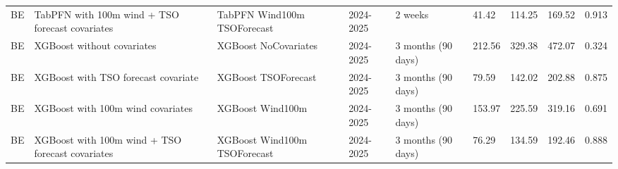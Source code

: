 \begin{longtable}{lllllllll}
BE & TabPFN with 100m wind + TSO forecast covariates & TabPFN Wind100m TSOForecast & 2024-2025 & 2 weeks & 41.42 & 114.25 & 169.52 & 0.913 \\
BE & XGBoost without covariates & XGBoost NoCovariates & 2024-2025 & 3 months (90 days) & 212.56 & 329.38 & 472.07 & 0.324 \\
BE & XGBoost with TSO forecast covariate & XGBoost TSOForecast & 2024-2025 & 3 months (90 days) & 79.59 & 142.02 & 202.88 & 0.875 \\
BE & XGBoost with 100m wind covariates & XGBoost Wind100m & 2024-2025 & 3 months (90 days) & 153.97 & 225.59 & 319.16 & 0.691 \\
BE & XGBoost with 100m wind + TSO forecast covariates & XGBoost Wind100m TSOForecast & 2024-2025 & 3 months (90 days) & 76.29 & 134.59 & 192.46 & 0.888 \\
\end{longtable}
